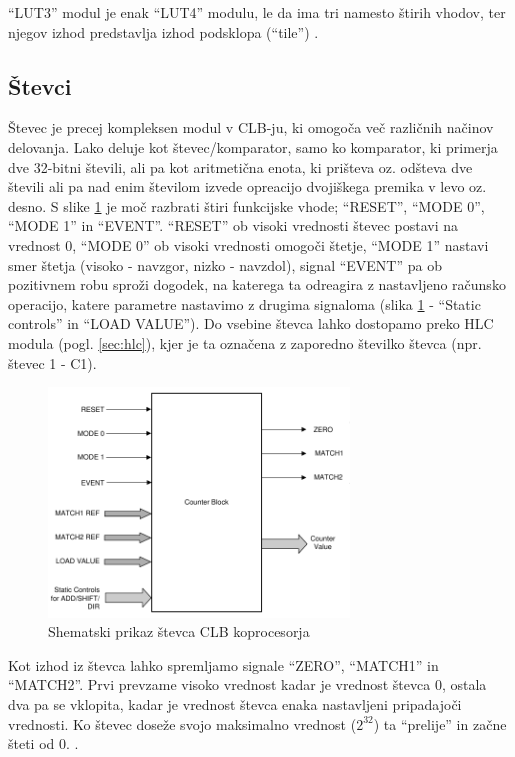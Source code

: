 \documentclass[a4paper]{article}
\begin{document}
\begin{sloppypar}
``LUT3'' modul je enak ``LUT4'' modulu, le da ima tri namesto štirih vhodov,
ter njegov izhod predstavlja izhod podsklopa (``tile'')
\cite[Pogl.~26.4.4-26.4.5]{mcu-ref-manual}.

\subsection{Števci}
Števec je precej kompleksen modul v CLB-ju, ki omogoča več različnih načinov
delovanja.  Lako deluje kot števec/komparator, samo ko komparator, ki primerja
dve 32-bitni števili, ali pa kot aritmetična enota, ki prišteva oz. odšteva dve
števili ali pa nad enim številom izvede opreacijo dvojiškega premika v levo oz.
desno. S slike \ref{fig:stevec} je moč razbrati štiri funkcijske vhode;
``RESET'', ``MODE 0'', ``MODE 1'' in ``EVENT''. ``RESET'' ob visoki vrednosti
števec postavi na vrednost 0, ``MODE 0'' ob visoki vrednosti omogoči štetje,
``MODE 1'' nastavi smer štetja (visoko - navzgor, nizko - navzdol), signal
``EVENT'' pa ob pozitivnem robu sproži dogodek, na katerega ta odreagira z
nastavljeno računsko operacijo, katere parametre nastavimo z drugima signaloma
(slika \ref{fig:stevec} - ``Static controls'' in ``LOAD VALUE''). Do vsebine
števca lahko dostopamo preko HLC modula (pogl. \ref{sec:hlc}), kjer je ta
označena z zaporedno številko števca (npr. števec 1 - C1).

\begin{figure}[htb]
    \centerline{\includegraphics[width=8cm]{shema_stevec}}
    \caption{Shematski prikaz števca CLB koprocesorja
             \cite[Pogl.~26.4.2.1]{mcu-ref-manual}}
    \label{fig:stevec} 
\end{figure} 

Kot izhod iz števca lahko spremljamo signale ``ZERO'', ``MATCH1'' in
``MATCH2''. Prvi prevzame visoko vrednost kadar je vrednost števca 0, ostala
dva pa se vklopita, kadar je vrednost števca enaka nastavljeni pripadajoči
vrednosti. Ko števec doseže svojo maksimalno vrednost ($2^{32}$) ta ``prelije''
in začne šteti od 0.
\cite[Pogl.~26.4.2]{mcu-ref-manual}.


\end{sloppypar}
\end{document}

